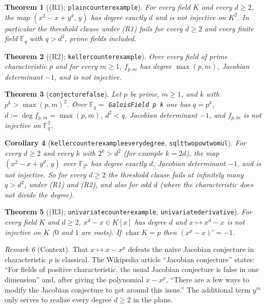 \documentclass[11pt]{article}
\renewcommand{\_}{\oldus\allowbreak}
\newtheorem{theorem}{Theorem}
\newtheorem{corollary}[theorem]{Corollary}
\theoremstyle{definition}
\theoremstyle{remark}
\newtheorem{remark}[theorem]{Remark}
\newcommand{\F}{\mathbb{F}}
\begin{document}
\begin{theorem}[(R1); \texttt{plain\_counterexample}]
For every field $K$ and every $d\ge2$, the map $(x^2-x+y^d,\,y)$ has degree exactly $d$ and is not
injective on $K^2$. In particular the threshold clause under (R1) fails for every $d\ge2$ and every
finite field $\F_q$ with $q>d^2$, prime fields included.
\end{theorem}

\begin{theorem}[(R2); \texttt{keller\_counterexample}]
Over every field of prime characteristic $p$ and for every $m\ge1$, $f_{p,m}$ has degree
$\max(p,m)$, Jacobian determinant $-1$, and is not injective.
\end{theorem}

\begin{theorem}[\texttt{conjecture\_00000002913\_false}]
Let $p$ be prime, $m\ge1$, and $k$ with $p^k>\max(p,m)^2$. Over $\F_q=$ \texttt{GaloisField p k}
one has $q=p^k$, $d:=\deg f_{p,m}=\max(p,m)$, $d^2<q$, Jacobian determinant $-1$, and $f_{p,m}$ is
not injective on $\F_q^2$.
\end{theorem}

\begin{corollary}[\texttt{keller\_counterexample\_every\_degree}, \texttt{sq\_lt\_two\_pow\_two\_mul}]
For every $d\ge2$ and every $k$ with $2^k>d^2$ (for example $k=2d$), the map $(x^2-x+y^d,\,y)$
over $\F_{2^k}$ has degree exactly $d$, Jacobian determinant $-1$, and is not injective. So for
every $d\ge2$ the threshold clause fails at infinitely many $q>d^2$, under (R1) and (R2), and also
for odd $d$ (where the characteristic does not divide the degree).
\end{corollary}

\begin{theorem}[(R3); \texttt{univariate\_counterexample}, \texttt{univariate\_derivative}]
For every field $K$ and $d\ge2$, $x^d-x\in K[x]$ has degree $d$ and $x\mapsto x^d-x$ is not
injective on $K$ ($0$ and $1$ are roots). If $\operatorname{char}K=p$ then $(x^p-x)'=-1$.
\end{theorem}

\begin{remark}[Context]
That $x\mapsto x-x^p$ defeats the naive Jacobian conjecture in characteristic $p$ is classical. The
Wikipedia article ``Jacobian conjecture'' states: ``For fields of positive characteristic, the
usual Jacobian conjecture is false in one dimension'' and, after giving the polynomial $x-x^p$,
``There are a few ways to modify the Jacobian conjecture to get around this issue.'' The
additional term $y^m$ only serves to realize every degree $d\ge2$ in the plane.
\end{remark}
\end{document}
